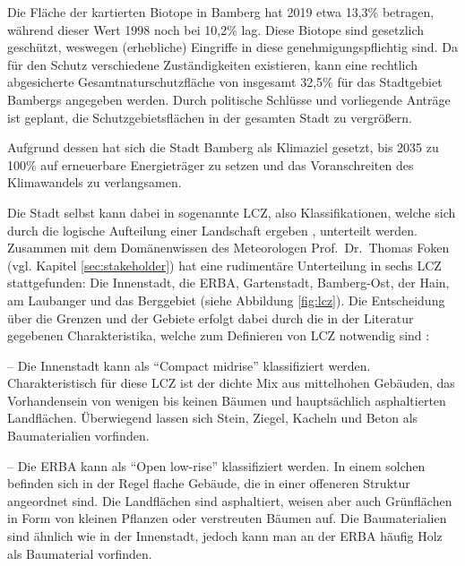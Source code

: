 Die Fläche der kartierten Biotope in Bamberg hat 2019 etwa 13,3\% betragen, während dieser Wert 1998 noch bei 10,2\% lag. Diese Biotope sind gesetzlich geschützt, weswegen (erhebliche) Eingriffe in diese genehmigungspflichtig sind. Da für den Schutz verschiedene Zuständigkeiten existieren, kann eine rechtlich abgesicherte Gesamtnaturschutzfläche von insgesamt 32,5\% für das Stadtgebiet Bambergs angegeben werden. Durch politische Schlüsse und vorliegende Anträge ist geplant, die Schutzgebietsflächen in der gesamten Stadt zu vergrößern. 

Aufgrund dessen hat sich die Stadt Bamberg als Klimaziel gesetzt, bis 2035 zu 100\% auf erneuerbare Energieträger zu setzen und das Voranschreiten des Klimawandels zu verlangsamen.

Die Stadt selbst kann dabei in sogenannte \ac{LCZ}, also Klassifikationen, welche sich durch die logische Aufteilung einer Landschaft ergeben \cite{stewart2011local}, unterteilt werden. Zusammen mit dem Domänenwissen des Meteorologen Prof.\ Dr.\ Thomas Foken (vgl. Kapitel \ref{sec:stakeholder}) hat eine rudimentäre Unterteilung in sechs \ac{LCZ} stattgefunden: Die Innenstadt, die ERBA, Gartenstadt, Bamberg-Ost, der Hain, am Laubanger und das Berggebiet (siehe Abbildung \ref{fig:lcz}). Die Entscheidung über die Grenzen und der Gebiete erfolgt dabei durch die in der Literatur gegebenen Charakteristika, welche zum Definieren von \ac{LCZ} notwendig sind \cite{oke2004initial, stewart2012local}:

 -- Die Innenstadt kann als \enquote{Compact midrise} klassifiziert werden. Charakteristisch für diese \ac{LCZ} ist der dichte Mix aus mittelhohen Gebäuden, das Vorhandensein von wenigen bis keinen Bäumen und hauptsächlich asphaltierten Landflächen. Überwiegend lassen sich Stein, Ziegel, Kacheln und Beton als Baumaterialien vorfinden.

 -- Die ERBA kann als \enquote{Open low-rise} klassifiziert werden. In einem solchen befinden sich in der Regel flache Gebäude, die in einer offeneren Struktur angeordnet sind. Die Landflächen sind asphaltiert, weisen aber auch Grünflächen in Form von kleinen Pflanzen oder verstreuten Bäumen auf. Die Baumaterialien sind ähnlich wie in der Innenstadt, jedoch kann man an der ERBA häufig Holz als Baumaterial vorfinden.

